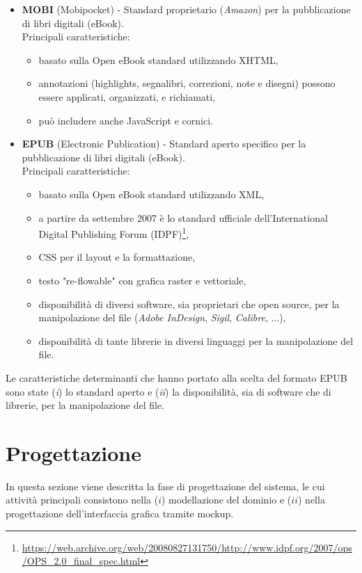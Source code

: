\begin{itemize}
    \item \textbf{MOBI} (Mobipocket) - Standard proprietario (\textit{Amazon}) per la pubblicazione di libri digitali (eBook).\\
    Principali caratteristiche:
    \begin{itemize}
        \item basato sulla Open eBook standard utilizzando XHTML,
        \item annotazioni (highlights, segnalibri, correzioni, note e disegni) possono essere applicati, organizzati, e richiamati,
        \item può includere anche JavaScript e cornici.
    \end{itemize}
    \item \textbf{EPUB} (Electronic Publication) - Standard aperto specifico per la pubblicazione di libri digitali (eBook).\\
    Principali caratteristiche:
    \begin{itemize}
        \item basato sulla Open eBook standard utilizzando XML,
        \item a partire da settembre 2007 è lo standard ufficiale dell'International Digital Publishing Forum (IDPF)\footnote{\url{https://web.archive.org/web/20080827131750/http://www.idpf.org/2007/ops/OPS_2.0_final_spec.html}},
        \item CSS per il layout e la formattazione,
        \item testo "re-flowable" con grafica raster e vettoriale,
        \item disponibilità di diversi software, sia proprietari che open source, per la manipolazione del file (\textit{Adobe InDesign}, \textit{Sigil}, \textit{Calibre}, ...),
        \item disponibilità di tante librerie in diversi linguaggi per la manipolazione del file.
    \end{itemize}
\end{itemize}
Le caratteristiche determinanti che hanno portato alla scelta del formato EPUB sono state (\textit{i}) lo standard aperto e (\textit{ii}) la disponibilità, sia di software che di librerie, per la manipolazione del file. 

\section{Progettazione}
In questa sezione viene descritta la fase di progettazione del sistema, le cui attività principali consistono nella ($i$) modellazione del dominio e ($ii$) nella progettazione dell'interfaccia grafica tramite mockup.

